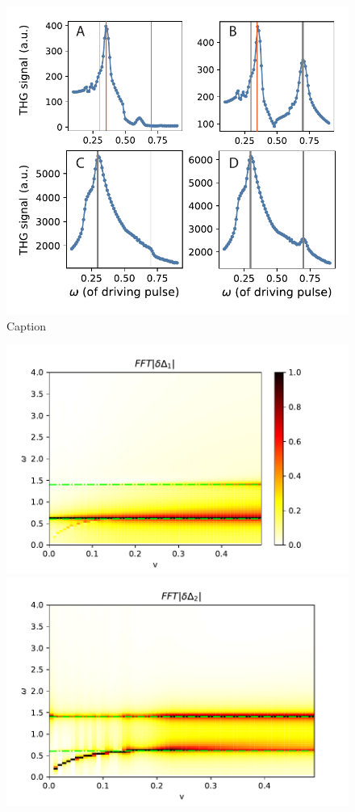 \documentclass[aps,prb,reprint,noeprint,superscriptaddress]{revtex4-1}
\begin{document}
\begin{figure}[ht]
  \centering
  \includegraphics[width=\columnwidth]{figures/fig-driving}
  \caption{Caption}
\end{figure}
\begin{figure}[ht]
  \centering
  \includegraphics[width=\columnwidth]{figures/2_a}
  \includegraphics[width=\columnwidth]{figures/2_b}
\end{figure}
\end{document}
